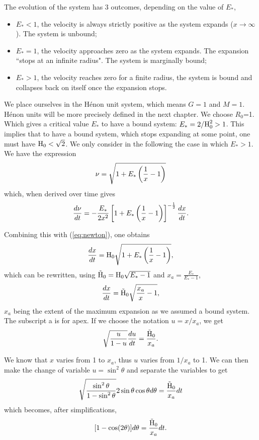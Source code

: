 The evolution of the system has 3 outcomes, depending on the value of $E_\ast$,
\begin{itemize}
\item $E_\ast<1$, the velocity is always strictly positive as the system expands ($x\rightarrow\infty$). The system is unbound;
\item $E_\ast=1$, the velocity approaches zero as the system expands. The expansion ``stops at an infinite radius". The system is marginally bound;
\item $E_\ast>1$, the velocity reaches zero for a finite radius, the system is bound and collapses back on itself once the expansion stops. 
\end{itemize}

We place ourselves in the H\'enon unit system, which means $G=1$ and $M=1$. H\'enon units will be more precisely defined in the next chapter. We choose $R_0$=1. Which gives a critical value $E_*$ to have a bound system: $E_* = 2 /{\textrm{H}}^2_0 > 1$. This implies that to have a bound system, which stops expanding at some point, one must have ${\textrm{H}}_0 < \sqrt{2}$.
We only consider in the following the case in which $E_\ast>1$. We have the expression
\begin{equation}
\nu = \sqrt{1+E_\ast\left(\frac{1}{x} - 1\right)}
\end{equation}
which, when derived over time gives
\begin{equation}
\frac{d \nu}{dt} = - \frac{E_\ast}{2 x^2} \left[ 1 + E_\ast\left(\frac{1}{x} -1\right)\right]^{-\frac{1}{2}} \frac{dx}{dt}.
\end{equation}

Combining this with (\ref{eq:newton}), one obtains
\begin{equation}
\frac{dx}{dt} = {\textrm{H}}_0 \sqrt{1+ E_\ast\left( \frac{1}{x} -1\right)},
\end{equation}
which can be rewritten, using $\tilde{{\textrm{H}}}_0 = {\textrm{H}}_0 \sqrt{E_\ast-1}$ and $x_a=\frac{E_\ast}{E_\ast-1}$,
\begin{equation}
\frac{dx}{dt} = \tilde{{\textrm{H}}}_0 \sqrt{\frac{x_a}{x}-1},
\end{equation}
$x_a$ being the extent of the maximum expansion as we assumed a bound system. The subscript a is for apex. If we choose the notation $u = x/x_a$, we get
\begin{equation}
\sqrt{\frac{u}{1-u}} \frac{du}{dt} = \frac{\tilde{{\textrm{H}}}_0}{x_a}.
\end{equation}

We know that $x$ varies from 1 to $x_a$, thus $u$ varies from $1/x_a$ to 1. We can then make the change of variable $u = \sin^2\theta$ and separate the variables to get
\begin{equation}
\sqrt{\frac{\sin^2\theta}{1-\sin^2\theta}} 2 \sin\theta \cos\theta d \theta = \frac{\tilde{{\textrm{H}}}_0}{x_a} dt
\end{equation}
which becomes, after simplifications,
\begin{equation}
\label{Eq:1_integrand_theta}
[ 1 - \cos(2\theta)]d\theta = \frac{\tilde{{\textrm{H}}}_0}{x_a} dt .
\end{equation}


